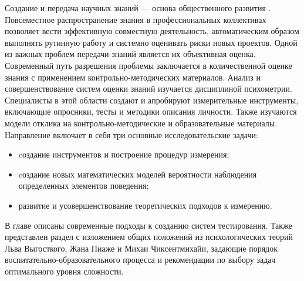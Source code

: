 Создание и передача научных знаний --- основа общественного развития \cite{bell2019coming}.
Повсеместное распространение знания в профессиональных коллективах позволяет вести эффективную совместную деятельность,
автоматическим образом выполнять рутинную работу и системно оценивать риски новых проектов. Одной из важных проблем
передачи знаний является их объективная оценка. Современный путь разрешения проблемы заключается в количественной
оценке знания с применением контрольно-методических материалов. Анализ и совершенствование систем оценки знаний изучается
дисциплиной психометрии. Специалисты в этой области создают и апробируют измерительные инструменты, включающие опросники, 
тесты и методики описания личности. Также изучаются модели отклика на контрольно-методические и образовательные материалы.
Направление включает в себя три основные исследовательские задачи:
\begin{itemize}
    \item cоздание инструментов и построение процедур измерения;
    \item cоздание новых математических моделей вероятности наблюдения определенных элементов поведения;
    \item развитие и усовершенствование теоретических подходов к измерению.
\end{itemize}

В главе описаны современные подходы к созданию систем тестирования. Также представлен раздел с 
изложением общих положений из психологических теорий Льва Выгосткого, Жана Пиаже и Михаи Чиксентмихайи, задающие 
порядок воспитательно-образовательного процесса и рекомендации по выбору задач оптимального уровня сложности.

